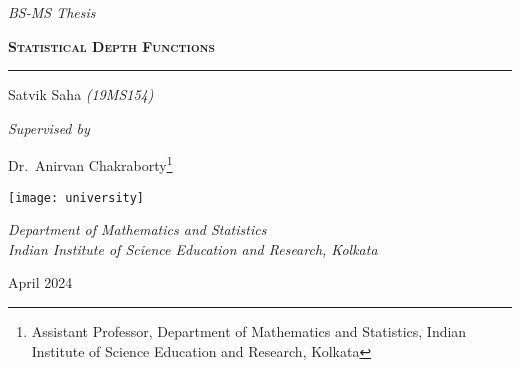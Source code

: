 \begin{titlepage}
    \vspace*{2cm}

    {\noindent\huge\itshape\color{black!70!white}
        BS-MS Thesis
    }
    \vspace{0.8cm}

    {\noindent\Huge\scshape\bfseries%
        Statistical Depth Functions
    }

    \vspace{0.8cm}
    \hrule
    \vspace{0.4cm}

    {\noindent\Large Satvik Saha \textcolor{black!70!white}{\textit{(19MS154)}}}
    \vspace{0.6cm}

    {\noindent\Large\itshape Supervised by}
    \vspace{0.1cm}

    \renewcommand*{\thefootnote}{\fnsymbol{footnote}}
    {\noindent\Large Dr.~Anirvan Chakraborty\footnote{Assistant Professor, Department of Mathematics and Statistics, Indian Institute of Science Education and Research, Kolkata}}

    \vfill

    \noindent\texttt{[image: university]}

    \vspace{0.2cm}

    {\noindent\large\itshape
        Department of Mathematics and Statistics \vspace{0.2em}\\
        Indian Institute of Science Education and Research, Kolkata \\
    }
    \vspace{0.8cm}

    {\noindent\large April 2024}

    \vspace*{2cm}
\end{titlepage}
